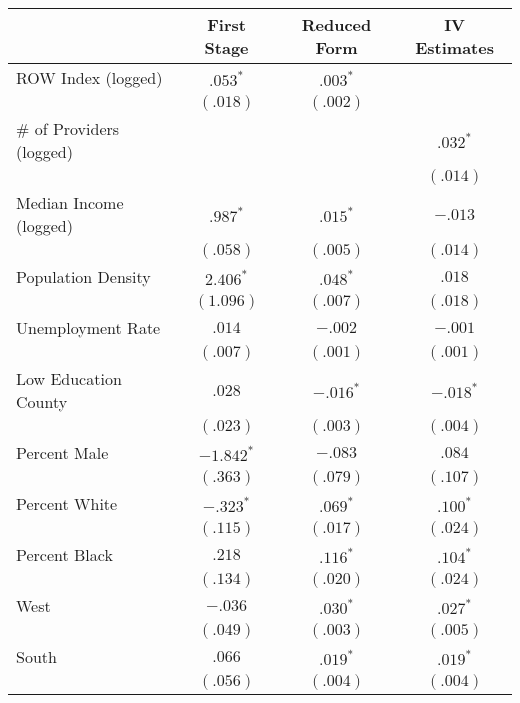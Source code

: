 
\begin{tabular}{l c c c}
\hline
 & First Stage & Reduced Form & IV Estimates \\
\hline
ROW Index (logged)       & $.053^{*}$   & $.003^{*}$  &             \\
                         & $(.018)$     & $(.002)$    &             \\
\# of Providers (logged) &              &             & $.032^{*}$  \\
                         &              &             & $(.014)$    \\
Median Income (logged)   & $.987^{*}$   & $.015^{*}$  & $-.013$     \\
                         & $(.058)$     & $(.005)$    & $(.014)$    \\
Population Density       & $2.406^{*}$  & $.048^{*}$  & $.018$      \\
                         & $(1.096)$    & $(.007)$    & $(.018)$    \\
Unemployment Rate        & $.014$       & $-.002$     & $-.001$     \\
                         & $(.007)$     & $(.001)$    & $(.001)$    \\
Low Education County     & $.028$       & $-.016^{*}$ & $-.018^{*}$ \\
                         & $(.023)$     & $(.003)$    & $(.004)$    \\
Percent Male             & $-1.842^{*}$ & $-.083$     & $.084$      \\
                         & $(.363)$     & $(.079)$    & $(.107)$    \\
Percent White            & $-.323^{*}$  & $.069^{*}$  & $.100^{*}$  \\
                         & $(.115)$     & $(.017)$    & $(.024)$    \\
Percent Black            & $.218$       & $.116^{*}$  & $.104^{*}$  \\
                         & $(.134)$     & $(.020)$    & $(.024)$    \\
West                     & $-.036$      & $.030^{*}$  & $.027^{*}$  \\
                         & $(.049)$     & $(.003)$    & $(.005)$    \\
South                    & $.066$       & $.019^{*}$  & $.019^{*}$  \\
                         & $(.056)$     & $(.004)$    & $(.004)$    \\

\end{tabular}
